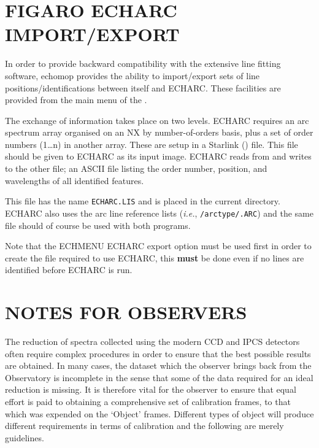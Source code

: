 \section{FIGARO ECHARC IMPORT/EXPORT}

In order to provide backward compatibility with the extensive line
fitting  software, {\sc echomop} provides the
ability to
import/export sets of line positions/identifications between itself
and ECHARC.  These facilities are provided from the main menu of the
.

The exchange of information takes place on two levels. ECHARC
requires an arc spectrum array organised on an NX by number-of-orders
basis, plus a set of order numbers (1\ldots n) in another array. These
are setup in a Starlink () file.
This file should be given to ECHARC as its input image.
ECHARC reads from and writes to the other file; an ASCII file listing the
order number, position, and wavelengths of all identified features.

This file has the name \verb+ECHARC.LIS+ and is placed in the current
directory.
ECHARC also uses the  arc line reference lists ({\it{i.e.}},
\verb+/arctype/.ARC+) and the same file should of course be used with both
programs.

Note that the ECHMENU ECHARC export option must be used first in order
to create the file required to use ECHARC, this {\bf must} be done
even if no lines are identified before ECHARC is run.


\newpage
\appendix
\section{NOTES FOR OBSERVERS}

The reduction of spectra collected using the modern CCD and IPCS detectors
often require complex procedures in order to ensure that the best
possible results are obtained. In many cases, the dataset which the
observer brings back from the Observatory is incomplete in the sense that
some of the data required for an ideal reduction is missing. It is therefore
vital for the observer to ensure that equal effort is paid to obtaining
a comprehensive set of calibration frames, to that which was expended on
the `Object' frames. Different types of object will produce different
requirements in terms of calibration and the following are merely
guidelines.


